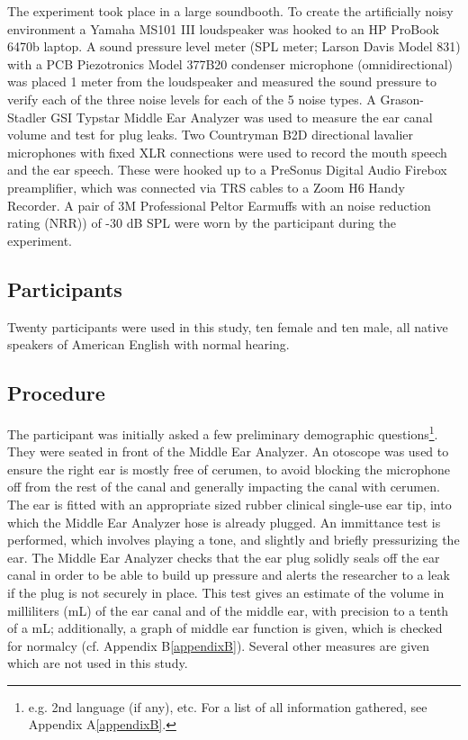 \documentclass[dissertation,copyright]{uathesis}
\begin{document}
The experiment took place in a large soundbooth.  To create the artificially noisy environment a Yamaha MS101 III loudspeaker was hooked to an HP ProBook 6470b laptop.  A sound pressure level meter (SPL meter; Larson Davis Model 831) with a PCB Piezotronics Model 377B20 condenser microphone (omnidirectional) was placed 1 meter from the loudspeaker and measured the sound pressure to verify each of the three noise levels for each of the 5 noise types. A Grason-Stadler GSI Typstar Middle Ear Analyzer was used to measure the ear canal volume and test for plug leaks.  Two Countryman B2D directional lavalier microphones with fixed XLR connections were used to record the mouth speech and the ear speech.  These were hooked up to a PreSonus Digital Audio Firebox preamplifier, which was connected via TRS cables to a Zoom H6 Handy Recorder. A pair of 3M Professional Peltor Earmuffs with an noise reduction rating (NRR)) of -30 dB SPL were worn by the participant during the experiment.


\subsection{Participants}
Twenty participants were used in this study, ten female and ten male, all native speakers of American English with normal hearing.

\subsection{Procedure}

The participant was initially asked a few preliminary demographic questions\footnote{e.g. 2nd language (if any), etc. For a list of all information gathered, see Appendix A\ref{appendixB}.}. They were seated in front of the Middle Ear Analyzer.  An otoscope was used to ensure the right ear is mostly free of cerumen, to avoid blocking the microphone off from the rest of the canal and generally impacting the canal with cerumen.  The ear is fitted with an appropriate sized rubber clinical single-use ear tip, into which the Middle Ear Analyzer hose is already plugged.  An immittance test is performed, which involves playing a tone, and slightly and briefly pressurizing the ear.  The Middle Ear Analyzer checks that the ear plug solidly seals off the ear canal in order to be able to build up pressure and alerts the researcher to a leak if the plug is not securely in place.  This test gives an estimate of the volume in milliliters (mL) of the ear canal and of the middle ear, with precision to a tenth of a mL; additionally, a graph of middle ear function is given, which is checked for normalcy (cf. Appendix B\ref{appendixB}).  Several other measures are given which are not used in this study.
\end{document}
